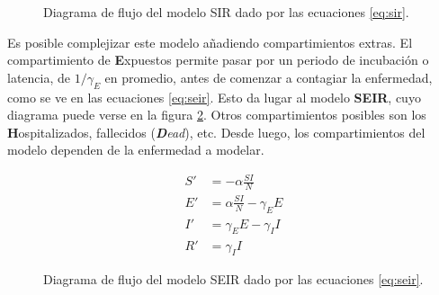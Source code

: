 \begin{figure}
\centering
{}

\caption{Diagrama de flujo del modelo SIR dado por las ecuaciones \ref{eq:sir}.} \label{fig:sir}
\end{figure}



Es posible complejizar este modelo añadiendo compartimientos extras. El compartimiento de \textbf{E}xpuestos permite pasar por un periodo de incubación o latencia, de \(1/\gamma_E\) en promedio, antes de comenzar a contagiar la enfermedad, como se ve en las ecuaciones \ref{eq:seir}. Esto da lugar al modelo \textbf{SEIR}, cuyo diagrama puede verse en la figura \ref{fig:seir}. Otros compartimientos posibles son los \textbf{H}ospitalizados, fallecidos (\textit{\textbf{D}ead}), etc. Desde luego, los compartimientos del modelo dependen de la enfermedad a modelar.


\begin{equation}
\label{eq:seir}
\begin{aligned}
S' &=  -\alpha \frac{SI}{N} \\
E' &= \alpha \frac{SI}{N} - \gamma_E E \\
I' &= \gamma_E E - \gamma_I I \\
R' &= \gamma_I I
\end{aligned}
\end{equation}


\begin{figure}
\centering
{}
\caption{Diagrama de flujo del modelo SEIR dado por las ecuaciones \ref{eq:seir}.} \label{fig:seir}
\end{figure}

